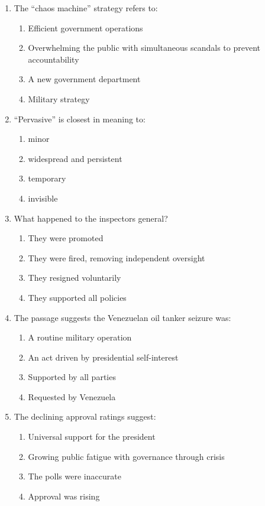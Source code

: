 \documentclass[10pt,a4paper]{article}
\begin{document}
\begin{enumerate}[label=\textbf{\arabic*.}, start=6]
\item The ``chaos machine'' strategy refers to:
\begin{enumerate}[label=(\Alph*)]
\item Efficient government operations
\item Overwhelming the public with simultaneous scandals to
prevent accountability
\item A new government department
\item Military strategy
\end{enumerate}

\item ``Pervasive'' is closest in meaning to:
\begin{enumerate}[label=(\Alph*)]
\item minor \item widespread and persistent
\item temporary \item invisible
\end{enumerate}

\item What happened to the inspectors general?
\begin{enumerate}[label=(\Alph*)]
\item They were promoted
\item They were fired, removing independent oversight
\item They resigned voluntarily
\item They supported all policies
\end{enumerate}

\item The passage suggests the Venezuelan oil tanker seizure was:
\begin{enumerate}[label=(\Alph*)]
\item A routine military operation
\item An act driven by presidential self-interest
\item Supported by all parties
\item Requested by Venezuela
\end{enumerate}

\item The declining approval ratings suggest:
\begin{enumerate}[label=(\Alph*)]
\item Universal support for the president
\item Growing public fatigue with governance through crisis
\item The polls were inaccurate
\item Approval was rising
\end{enumerate}
\end{enumerate}
\end{document}
